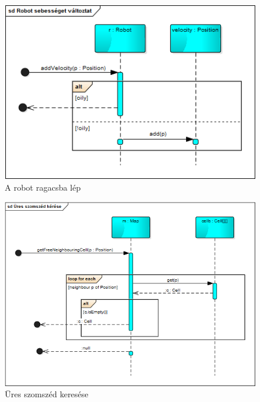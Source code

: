 \begin{figure}[!htbp]
	\begin{center}
		\includegraphics[width=166mm, center]{./vegleges_statikus_seq/changevelocity.png}
		\caption{A robot ragacsba lép}
	\end{center}
\end{figure}

\begin{figure}[!htbp]
	\begin{center}
		\includegraphics[width=166mm, center]{./vegleges_statikus_seq/free.png}
		\caption{Üres szomszéd keresése}
	\end{center}
\end{figure}

